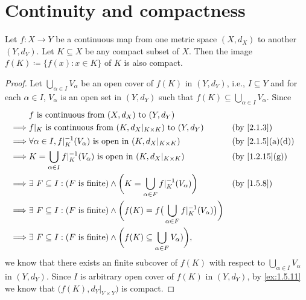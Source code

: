 \section{Continuity and compactness}\label{sec:2.3}

\begin{thm}\label{2.3.1}
  Let \(f : X \to Y\) be a continuous map from one metric space \((X, d_X)\) to another \((Y, d_Y)\).
  Let \(K \subseteq X\) be any compact subset of \(X\).
  Then the image \(f(K) \coloneqq \{f(x) : x \in K\}\) of \(K\) is also compact.
\end{thm}

\begin{proof}
  Let \(\bigcup_{\alpha \in I} V_\alpha\) be an open cover of \(f(K)\) in \((Y, d_Y)\), i.e., \(I \subseteq Y\) and for each \(\alpha \in I\), \(V_{\alpha}\) is an open set in \((Y, d_Y)\) such that \(f(K) \subseteq \bigcup_{\alpha \in I} V_\alpha\).
  Since
  \begin{align*}
             & f \text{ is continuous from } (X, d_X) \text{ to } (Y, d_Y)                                                                                                       \\
    \implies & f|_K \text{ is continuous from } (K, d_X|_{K \times K}) \text{ to } (Y, d_Y)                                                  &  & \by{2.1.3}                     \\
    \implies & \forall \alpha \in I, f|_K^{-1}(V_\alpha) \text{ is open in } (K, d_X|_{K \times K})                                          &  & \text{(by \cref{2.1.5}(a)(d))} \\
    \implies & K = \bigcup_{\alpha \in I} f|_K^{-1}(V_\alpha) \text{ is open in } (K, d_X|_{K \times K})                                     &  & \text{(by \cref{1.2.15}(g))}   \\
    \implies & \exists\ F \subseteq I : (F \text{ is finite}) \land \bigg(K = \bigcup_{\alpha \in F} f|_K^{-1}(V_\alpha)\bigg)               &  & \by{1.5.8}                     \\
    \implies & \exists\ F \subseteq I : (F \text{ is finite}) \land \bigg(f(K) = f\big(\bigcup_{\alpha \in F} f|_K^{-1}(V_\alpha)\big)\bigg)                                     \\
    \implies & \exists\ F \subseteq I : (F \text{ is finite}) \land \bigg(f(K) \subseteq \bigcup_{\alpha \in F} V_\alpha)\bigg),
  \end{align*}
  we know that there exists an finite subcover of \(f(K)\) with respect to \(\bigcup_{\alpha \in I} V_\alpha\) in \((Y, d_Y)\).
  Since \(I\) is arbitrary open cover of \(f(K)\) in \((Y, d_Y)\), by \cref{ex:1.5.11} we know that \(\big(f(K), d_Y|_{Y \times Y}\big)\) is compact.
\end{proof}

